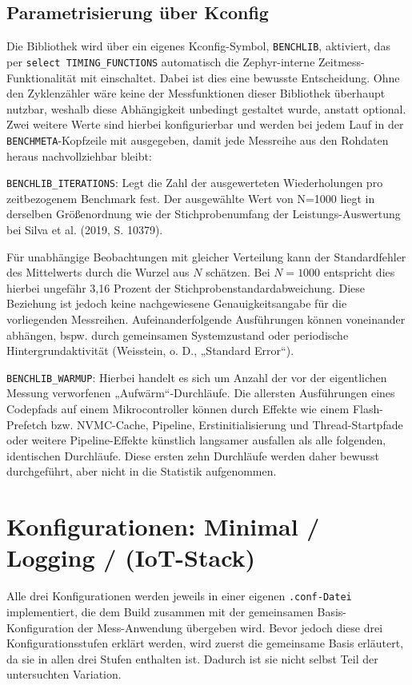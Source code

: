 \subsection{Parametrisierung über Kconfig}
Die Bibliothek wird über ein eigenes Kconfig-Symbol, \lstinline[style=fileinline]|BENCHLIB|, aktiviert, das per \lstinline[style=fileinline]|select TIMING_FUNCTIONS| automatisch die Zephyr-interne Zeitmess-Funktionalität mit einschaltet. Dabei ist dies eine bewusste Entscheidung. Ohne den Zyklenzähler wäre keine der Messfunktionen dieser Bibliothek überhaupt nutzbar, weshalb diese Abhängigkeit unbedingt gestaltet wurde, anstatt optional. Zwei weitere Werte sind hierbei konfigurierbar und werden bei jedem Lauf in der \lstinline[style=fileinline]|BENCHMETA|-Kopfzeile mit ausgegeben, damit jede Messreihe aus den Rohdaten heraus nachvollziehbar bleibt:

\lstinline[style=fileinline]|BENCHLIB_ITERATIONS|: Legt die Zahl der ausgewerteten Wiederholungen pro zeitbezogenem Benchmark fest. Der ausgewählte Wert von N=1000 liegt in derselben Größenordnung wie der Stichprobenumfang der Leistungs-Auswertung bei Silva et al. (2019, S. 10379).

Für unabhängige Beobachtungen mit gleicher Verteilung kann der Standardfehler des Mittelwerts durch die Wurzel aus \(N\) schätzen. Bei \(N=1000\) entspricht dies hierbei ungefähr 3,16 Prozent der Stichprobenstandardabweichung. Diese Beziehung ist jedoch keine nachgewiesene Genauigkeitsangabe für die vorliegenden Messreihen. Aufeinanderfolgende Ausführungen können voneinander abhängen, bspw. durch gemeinsamen Systemzustand oder periodische Hintergrundaktivität (Weisstein, o. D., „Standard Error“).

\lstinline[style=fileinline]|BENCHLIB_WARMUP|: Hierbei handelt es sich um Anzahl der vor der eigentlichen Messung verworfenen „Aufwärm“-Durchläufe. Die allersten Ausführungen eines Codepfads auf einem Mikrocontroller können durch Effekte wie einem Flash-Prefetch bzw. NVMC-Cache, Pipeline, Erstinitialisierung und Thread-Startpfade oder weitere Pipeline-Effekte künstlich langsamer ausfallen als alle folgenden, identischen Durchläufe. Diese ersten zehn Durchläufe werden daher bewusst durchgeführt, aber nicht in die Statistik aufgenommen.

\section{Konfigurationen: Minimal / Logging / (IoT-Stack)}
Alle drei Konfigurationen werden jeweils in einer eigenen \lstinline[style=fileinline]|.conf-Datei| implementiert, die dem Build zusammen mit der gemeinsamen Basis-Konfiguration der Mess-Anwendung übergeben wird. Bevor jedoch diese drei Konfigurationsstufen erklärt werden, wird zuerst die gemeinsame Basis erläutert, da sie in allen drei Stufen enthalten ist. Dadurch ist sie nicht selbst Teil der untersuchten Variation.

